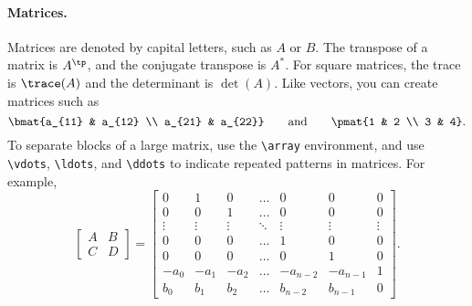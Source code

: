 \paragraph{Matrices.} Matrices are denoted by capital letters, such as $A$ or $B$. The transpose of a matrix is $A^\tp$, and the conjugate transpose is $A^*$. For square matrices, the trace is $\trace(A)$ and the determinant is $\det(A)$. Like vectors, you can create matrices such as
\[
  \bmat{a_{11} & a_{12} \\ a_{21} & a_{22}} \qquad\text{and}\qquad \pmat{1 & 2 \\ 3 & 4}.
\]
To separate blocks of a large matrix, use the \verb|\array| environment, and use \verb|\vdots|, \verb|\ldots|, and \verb|\ddots| to indicate repeated patterns in matrices. For example,
\[
  \left[\begin{array}{c|c}
  A & B \\ \hline C & D \end{array}\right] = \left[\begin{array}{cccccc|c}
  0 & 1 & 0 & \ldots & 0 & 0 & 0 \\
  0 & 0 & 1 & \ldots & 0 & 0 & 0 \\
  \vdots & \vdots & \vdots & \ddots & \vdots & \vdots & \vdots \\
  0 & 0 & 0 & \ldots & 1 & 0 & 0 \\
  0 & 0 & 0 & \ldots & 0 & 1 & 0 \\
  -a_0 & -a_1 & -a_2 & \ldots & -a_{n-2} & -a_{n-1} & 1 \\ \hline
  b_0 & b_1 & b_2 & \ldots & b_{n-2} & b_{n-1} & 0 \end{array}\right].
\]